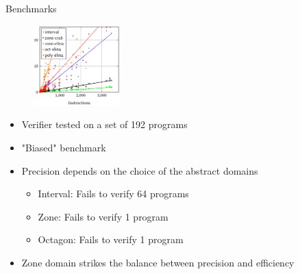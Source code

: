 \documentclass[aspectratio=169]{beamer}
\begin{document}
\begin{frame}{Benchmarks}
  \begin{figure}
    \centering
    \includegraphics[width=0.3\textwidth]{benchmark.png}
  \end{figure}
  \begin{itemize}
    \item Verifier tested on a set of 192 programs
    \item "Biased" benchmark
    \item Precision depends on the choice of the abstract domains
          \begin{itemize}
            \item Interval: Fails to verify 64 programs
            \item Zone: Fails to verify 1 program
            \item Octagon: Fails to verify 1 program
          \end{itemize}
    \item Zone domain strikes the balance between precision and efficiency
  \end{itemize}
\end{frame}

\begin{frame}{}
\end{frame}
\end{document}
